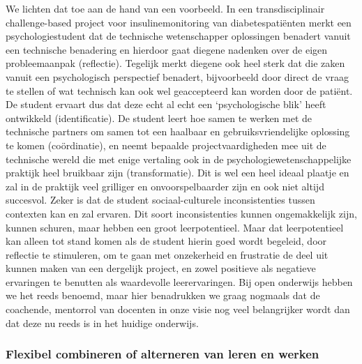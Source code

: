 \documentclass[empirical, authordate, ]{new-jote-article}
\begin{document}
	We lichten dat toe aan de hand van een voorbeeld. In een transdisciplinair challenge-based project voor insulinemonitoring van diabetespatiënten merkt een psychologiestudent dat de technische wetenschapper oplossingen benadert vanuit een technische benadering en hierdoor gaat diegene nadenken over de eigen probleemaanpak (reflectie). Tegelijk merkt diegene ook heel sterk dat die zaken vanuit een psychologisch perspectief benadert, bijvoorbeeld door direct de vraag te stellen of wat technisch kan ook wel geaccepteerd kan worden door de patiënt. De student ervaart dus dat deze echt al echt een ‘psychologische blik' heeft ontwikkeld (identificatie). De student leert hoe samen te werken met de technische partners om samen tot een haalbaar en gebruiksvriendelijke oplossing te komen (coördinatie), en neemt bepaalde projectvaardigheden mee uit de technische wereld die met enige vertaling ook in de psychologiewetenschappelijke praktijk heel bruikbaar zijn (transformatie). Dit is wel een heel ideaal plaatje en zal in de praktijk veel grilliger en onvoorspelbaarder zijn en ook niet altijd succesvol. Zeker is dat de student sociaal-culturele inconsistenties tussen contexten kan en zal ervaren. Dit soort inconsistenties kunnen ongemakkelijk zijn, kunnen schuren, maar hebben een groot leerpotentieel. Maar dat leerpotentieel kan alleen tot stand komen als de student hierin goed wordt begeleid, door reflectie te stimuleren, om te gaan met onzekerheid en frustratie de deel uit kunnen maken van een dergelijk project, en zowel positieve als negatieve ervaringen te benutten als waardevolle leerervaringen. Bij open onderwijs hebben we het reeds benoemd, maar hier benadrukken we graag nogmaals dat de coachende, mentorrol van docenten in onze visie nog veel belangrijker wordt dan dat deze nu reeds is in het huidige onderwijs.



	\subsubsection{Flexibel combineren of alterneren van leren en werken}
\end{document}
